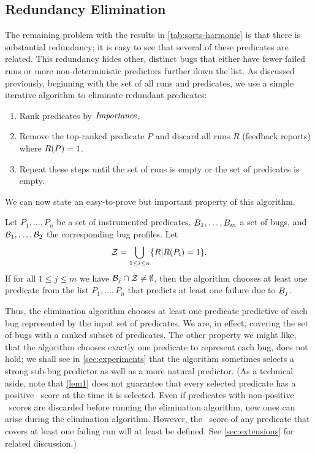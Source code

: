 \subsection{Redundancy Elimination}
\label{sec:elimination}

The remaining problem with the results in \autoref{tab:sorts-harmonic}
is that there is substantial redundancy; it is easy to see that
several of these predicates are related.  This redundancy hides other,
distinct bugs that either have fewer failed runs or more
non-deterministic predictors further down the list.  As discussed
previously, beginning with the set of all runs and predicates, we use
a simple iterative algorithm to eliminate redundant predicates:
\begin{enumerate}

\item Rank predicates by $\textit{Importance}$.

\item Remove the top-ranked predicate $P$ and discard all runs $R$
  (feedback reports) where $R(P) = 1$.

\item Repeat these steps until the set of runs is empty or the set of predicates is empty.
\end{enumerate}

We can now state an easy-to-prove but important property of this algorithm.
\begin{lemma}
\label{lem1}
Let $P_1,\ldots,P_n$ be a set of instrumented predicates, $B_1,\ldots,B_m$
a set of bugs, and $\mathcal{B}_1,\ldots, \mathcal{B}_2$ the corresponding
bug profiles.  Let
\[ {\cal Z} = \bigcup_{1 \leq i \leq n} \{ R | R(P_i) = 1 \} . \]
If for all $1 \leq j \leq m$ we have $\mathcal{B}_j \cap {\cal Z} \neq \emptyset$, then
the algorithm chooses at least one predicate from the list $P_1,\ldots,P_n$ that predicts
at least one failure due to $B_j$.
\end{lemma}

Thus, the elimination algorithm chooses at least one predicate
predictive of each bug represented by the input set of predicates.
We are, in effect, covering the set of bugs with a ranked subset of predicates.
The other property we might like, that the algorithm chooses exactly
one predicate to represent each bug, does not hold; we shall see in
\autoref{sec:experiments} that the algorithm sometimes selects a
strong sub-bug predictor as well as a more natural predictor.  (As a
technical aside, note that \autoref{lem1} does not guarantee that every
selected predicate has a positive \increase\ score at the time it is
selected.  Even if predicates with non-positive \increase\ scores are
discarded before running the elimination algorithm, new ones can arise
during the elimination algorithm.  However, the
\increase\ score of any predicate that covers at least one failing run will
at least be defined.  See \autoref{sec:extensions} for related discussion.)

